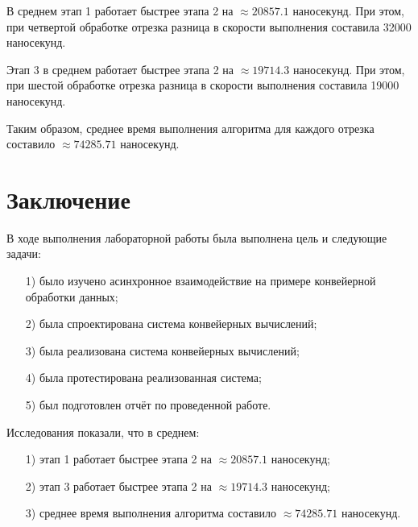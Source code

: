 \documentclass[12pt]{report}
\begin{document}
В среднем этап 1 работает быстрее этапа 2 на $\approx 20857.1$ наносекунд. При этом, при четвертой обработке отрезка разница в скорости выполнения составила 32000 наносекунд.

Этап 3 в среднем работает быстрее этапа 2 на $\approx 19714.3$ наносекунд. При этом, при шестой обработке отрезка разница в скорости выполнения составила 19000 наносекунд.

Таким образом, среднее время выполнения алгоритма для каждого отрезка составило $\approx 74285.71$ наносекунд.

\chapter*{Заключение}
В ходе выполнения лабораторной работы была выполнена цель и следующие задачи:
\begin{enumerate}
\item[1)] было изучено асинхронное взаимодействие на примере конвейерной обработки данных;
\item[2)] была спроектирована система конвейерных вычислений;
\item[3)] была реализована система конвейерных вычислений;
\item[4)] была протестирована реализованная система;
\item[5)] был подготовлен отчёт по проведенной работе.
\end{enumerate}

Исследования показали, что в среднем:
\begin{enumerate}
\item[1)] этап 1 работает быстрее этапа 2 на $\approx 20857.1$ наносекунд;
\item[2)] этап 3 работает быстрее этапа 2 на $\approx 19714.3$ наносекунд;
\item[3)] среднее время выполнения алгоритма составило $\approx 74285.71$ наносекунд.
\end{enumerate}

\end{document}
